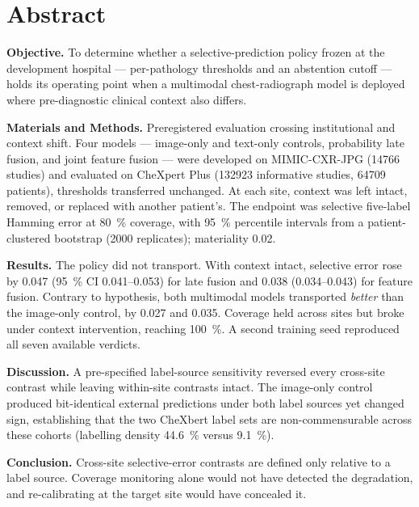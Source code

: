 \documentclass[12pt,a4paper]{article}
\begin{document}
\section*{Abstract}

\noindent\textbf{Objective.}
To determine whether a selective-prediction policy frozen at the development
hospital --- per-pathology thresholds and an abstention cutoff --- holds its
operating point when a multimodal chest-radiograph model is deployed where
pre-diagnostic clinical context also differs.

\noindent\textbf{Materials and Methods.}
Preregistered evaluation crossing institutional and context shift. Four models
--- image-only and text-only controls, probability late fusion, and joint
feature fusion --- were developed on MIMIC-CXR-JPG (\num{14766} studies) and
evaluated on CheXpert Plus (\num{132923} informative studies, \num{64709}
patients), thresholds transferred unchanged. At each site, context was
left intact, removed, or replaced with another patient's. The endpoint was
selective five-label Hamming error at \SI{80}{\percent} coverage, with
\SI{95}{\percent} percentile intervals from a patient-clustered bootstrap
(\num{2000} replicates); materiality \num{0.02}.

\noindent\textbf{Results.}
The policy did not transport. With context intact, selective error rose by
\num{0.047} (\SI{95}{\percent} CI \numrange{0.041}{0.053}) for late fusion and
\num{0.038} (\numrange{0.034}{0.043}) for feature fusion. Contrary to
hypothesis, both multimodal models transported \emph{better} than the
image-only control, by \num{0.027} and \num{0.035}. Coverage held across sites
but broke under context intervention, reaching \SI{100}{\percent}. A second
training seed reproduced all seven available verdicts.

\noindent\textbf{Discussion.}
A pre-specified label-source sensitivity reversed every cross-site contrast
while leaving within-site contrasts intact. The image-only control produced
bit-identical external predictions under both label sources yet changed sign,
establishing that the two CheXbert label sets are non-commensurable across
these cohorts (labelling density \SI{44.6}{\percent} versus
\SI{9.1}{\percent}).

\noindent\textbf{Conclusion.}
Cross-site selective-error contrasts are defined only relative to a label
source. Coverage monitoring alone would not have detected the degradation, and
re-calibrating at the target site would have concealed it.
\end{document}
